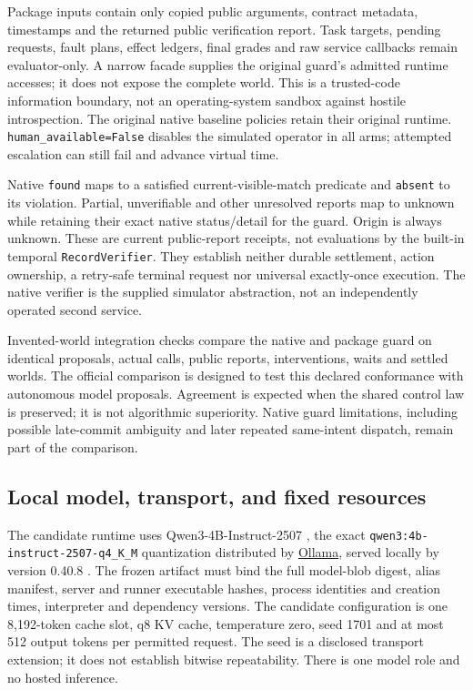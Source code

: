 Package inputs contain only copied public arguments, contract metadata,
timestamps and the returned public verification report. Task targets, pending
requests, fault plans, effect ledgers, final grades and raw service callbacks
remain evaluator-only. A narrow facade supplies the original guard's admitted
runtime accesses; it does not expose the complete world. This is a trusted-code
information boundary, not an operating-system sandbox against hostile
introspection. The original native baseline policies retain their original
runtime. \texttt{human\_available=False} disables the simulated operator in all
arms; attempted escalation can still fail and advance virtual time.

Native \texttt{found} maps to a satisfied current-visible-match predicate and
\texttt{absent} to its violation. Partial, unverifiable and other unresolved
reports map to unknown while retaining their exact native status/detail for
the guard. Origin is always unknown. These are current public-report receipts,
not evaluations by the built-in temporal \texttt{RecordVerifier}. They establish
neither durable settlement, action ownership, a retry-safe terminal request nor
universal exactly-once execution. The native verifier is the supplied simulator
abstraction, not an independently operated second service.

Invented-world integration checks compare the native and package guard on
identical proposals, actual calls, public reports, interventions, waits and
settled worlds. The official comparison is designed to test this declared
conformance with autonomous model proposals. Agreement is expected when the
shared control law is preserved; it is not algorithmic superiority. Native
guard limitations, including possible late-commit ambiguity and later repeated
same-intent dispatch, remain part of the comparison.

\subsection{Local model, transport, and fixed resources}

The candidate runtime uses Qwen3-4B-Instruct-2507 \cite{qwenmodel}, the exact
\texttt{qwen3:4b-instruct-2507-q4\_K\_M} quantization distributed by
\href{https://ollama.com/library/qwen3:4b-instruct-2507-q4_K_M}{Ollama}, served
locally by version 0.40.8 \cite{ollamaruntime}. The frozen artifact must bind
the full model-blob digest, alias manifest, server and runner executable hashes,
process identities and creation times, interpreter and dependency versions.
The candidate configuration is one 8,192-token cache slot, q8 KV cache,
temperature zero, seed 1701 and at most 512 output tokens per permitted request.
The seed is a disclosed transport extension; it does not establish bitwise
repeatability. There is one model role and no hosted inference.

